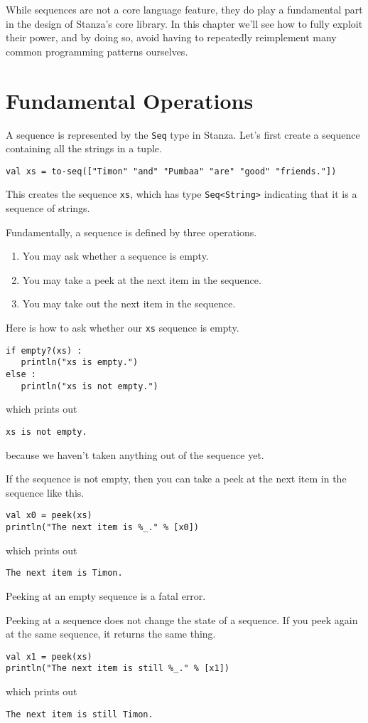 \documentclass[10pt,oneside]{book}
\begin{document}
While sequences are not a core language feature, they do play a fundamental part in the design of Stanza's core library. In this chapter we'll see how to fully exploit their power, and by doing so, avoid having to repeatedly reimplement many common programming patterns ourselves. 

\section{Fundamental Operations}
A sequence is represented by the \texttt{\frenchspacing Seq} type in Stanza. Let's first create a sequence containing all the strings in a tuple.
\begin{lstlisting}
val xs = to-seq(["Timon" "and" "Pumbaa" "are" "good" "friends."])
\end{lstlisting}
This creates the sequence \texttt{\frenchspacing xs}, which has type \texttt{\frenchspacing Seq<String>} indicating that it is a sequence of strings.

Fundamentally, a sequence is defined by three operations.
\begin{enumerate}
\item You may ask whether a sequence is empty.
\item You may take a peek at the next item in the sequence.
\item You may take out the next item in the sequence.
\end{enumerate}

Here is how to ask whether our \texttt{\frenchspacing xs} sequence is empty.
\begin{lstlisting}
if empty?(xs) :
   println("xs is empty.")
else :
   println("xs is not empty.")
\end{lstlisting}
which prints out
\begin{lstlisting}
xs is not empty.
\end{lstlisting}
because we haven't taken anything out of the sequence yet. 

If the sequence is not empty, then you can take a peek at the next item in the sequence like this.
\begin{lstlisting}
val x0 = peek(xs)
println("The next item is %_." % [x0])
\end{lstlisting}
which prints out
\begin{lstlisting}
The next item is Timon.
\end{lstlisting}
Peeking at an empty sequence is a fatal error.

Peeking at a sequence does not change the state of a sequence. If you peek again at the same sequence, it returns the same thing.
\begin{lstlisting}
val x1 = peek(xs)
println("The next item is still %_." % [x1])
\end{lstlisting}
which prints out
\begin{lstlisting}
The next item is still Timon.
\end{lstlisting}
\end{document}

